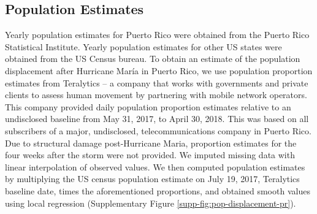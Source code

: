 \documentclass[11pt]{article}
\begin{document}
\subsection{Population Estimates}
\label{subsec:population}
Yearly population estimates for Puerto Rico were obtained from the Puerto Rico Statistical Institute. Yearly population estimates for other US states were obtained from the US Census bureau. To obtain an estimate of the population displacement after Hurricane Mar\'ia in Puerto Rico, we use population proportion estimates from Teralytics -- a company that works with governments and private clients to assess human movement by partnering with mobile network operators. This company provided daily population proportion estimates relative to an undisclosed baseline from May 31, 2017, to April 30, 2018. This was based on all subscribers of a major, undisclosed, telecommunications company in Puerto Rico. Due to structural damage post-Hurricane Maria, proportion estimates for the four weeks after the storm were not provided. We imputed missing data with linear interpolation of observed values. We then computed population estimates by multiplying the US census population estimate on July 19, 2017, Teralytics baseline date, times the aforementioned proportions, and obtained smooth values using local regression (Supplementary Figure \ref{supp-fig:pop-displacement-pr}).
\end{document}

